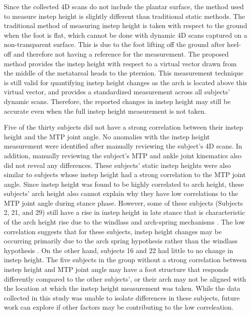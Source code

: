 \documentclass[defaultstyle,11pt]{thesis}
\begin{document}
Since the collected 4D scans do not include the plantar surface, the method used to measure instep height is slightly different than traditional static methods.
The traditional method of measuring instep height is taken with respect to the ground when the foot is flat, which cannot be done with dynamic 4D scans captured on a non-transparent surface.
This is due to the foot lifting off the ground after heel-off and therefore not having a reference for the measurement.
The proposed method provides the instep height with respect to a virtual vector drawn from the middle of the metatarsal heads to the pternion.
This measurement technique is still valid for quantifying instep height changes as the arch is located above this virtual vector, and provides a standardized measurement across all subjects' dynamic scans.
Therefore, the reported changes in instep height may still be accurate even when the full instep height measurement is not taken.

Five of the thirty subjects did not have a strong correlation between their instep height and the MTP joint angle.
No anomalies with the instep height measurement were identified after manually reviewing the subject's 4D scans.
In addition, manually reviewing the subject's MTP and ankle joint kinematics also did not reveal any differences.
These subjects' static instep heights were also similar to subjects whose instep height had a strong correlation to the MTP joint angle.
Since instep height was found to be highly correlated to arch height, these subjects' arch height also cannot explain why they have low correlations to the MTP joint angle during stance phase.
However, some of these subjects (Subjects 2, 21, and 29) still have a rise in instep height in late stance that is characteristic of the arch height rise due to the windlass and arch-spring mechanisms \citep{Hicks1954, Ker1987}.
The low correlation suggests that for these subjects, instep height changes may be occurring primarily due to the arch spring hypothesis rather than the windlass hypothesis \citep{Ker1987}.
On the other hand, subjects 16 and 22 had little to no change in instep height.
The five subjects in the group without a strong correlation between instep height and MTP joint angle may have a foot structure that responds differently compared to the other subjects', or their arch may not be aligned with the location at which the instep height measurement was taken.
While the data collected in this study was unable to isolate differences in these subjects, future work can explore if other factors may be contributing to the low correleation.
\end{document}
